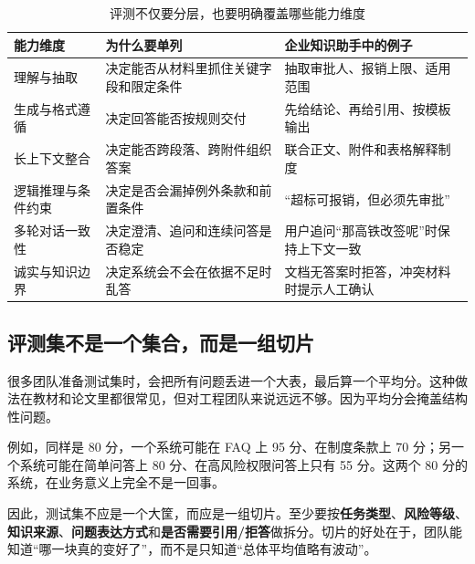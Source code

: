 \begin{table}[H]
\centering
\small
\begin{tabularx}{\textwidth}{>{\raggedright\arraybackslash}p{2.9cm}>{\raggedright\arraybackslash}p{3cm}>{\raggedright\arraybackslash}X}
\toprule
\textbf{能力维度} & \textbf{为什么要单列} & \textbf{企业知识助手中的例子} \\
\midrule
理解与抽取 & 决定能否从材料里抓住关键字段和限定条件 & 抽取审批人、报销上限、适用范围 \\
生成与格式遵循 & 决定回答能否按规则交付 & 先给结论、再给引用、按模板输出 \\
长上下文整合 & 决定能否跨段落、跨附件组织答案 & 联合正文、附件和表格解释制度 \\
逻辑推理与条件约束 & 决定是否会漏掉例外条款和前置条件 & “超标可报销，但必须先审批” \\
多轮对话一致性 & 决定澄清、追问和连续问答是否稳定 & 用户追问“那高铁改签呢”时保持上下文一致 \\
诚实与知识边界 & 决定系统会不会在依据不足时乱答 & 文档无答案时拒答，冲突材料时提示人工确认 \\
\bottomrule
\end{tabularx}
\caption{评测不仅要分层，也要明确覆盖哪些能力维度}
\label{tab:eval-capability-matrix}
\end{table}

\subsection{评测集不是一个集合，而是一组切片}
很多团队准备测试集时，会把所有问题丢进一个大表，最后算一个平均分。这种做法在教材和论文里都很常见，但对工程团队来说远远不够。因为平均分会掩盖结构性问题。

例如，同样是 80 分，一个系统可能在 FAQ 上 95 分、在制度条款上 70 分；另一个系统可能在简单问答上 80 分、在高风险权限问答上只有 55 分。这两个 80 分的系统，在业务意义上完全不是一回事。

因此，测试集不应是一个大筐，而应是一组切片。至少要按\textbf{任务类型}、\textbf{风险等级}、\textbf{知识来源}、\textbf{问题表达方式}和\textbf{是否需要引用/拒答}做拆分。切片的好处在于，团队能知道“哪一块真的变好了”，而不是只知道“总体平均值略有波动”。

